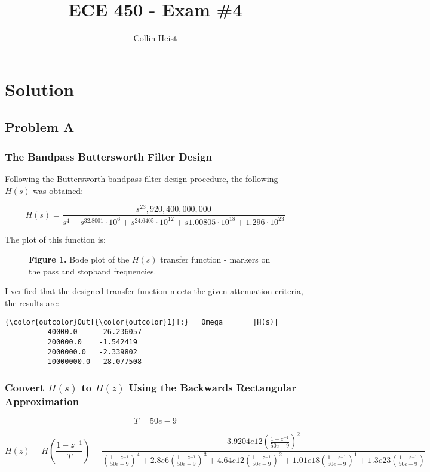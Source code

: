 \documentclass[11pt]{article}
\author{Collin Heist}
\title{ECE 450 - Exam \#4}
\begin{document}
    
    
    \maketitle
    
    

    
\section{Solution}
\subsection{Problem A}
\subsubsection{The Bandpass Buttersworth Filter Design}
Following the Buttersworth bandpass filter design procedure, the following $H(s)$ was obtained:

$$H(s)=\frac{s^23,920,400,000,000}{s^4+s^32.8001\cdot 10^6+s^24.6405\cdot 10^{12}+s1.00805\cdot 10^{18}+1.296\cdot 10^{23}}$$

The plot of this function is:

\begin{figure}[H]
\begin{center}
\caption{\textbf{Figure 1.} Bode plot of the $H(s)$ transfer function - markers on the pass and stopband frequencies.}
\end{center}
\end{figure}

I verified that the designed transfer function meets the given attenuation criteria, the results are:

\begin{Verbatim}[commandchars=\\\{\}]
{\color{outcolor}Out[{\color{outcolor}1}]:}   Omega       |H(s)|
          40000.0     -26.236057
          200000.0    -1.542419
          2000000.0   -2.339802
          10000000.0  -28.077508
\end{Verbatim}

\subsubsection{Convert $H(s)$ to $H(z)$ Using the Backwards Rectangular Approximation}
$$T = 50e-9$$

\[H(z)=H(\frac{1-z^{-1}}{T})=\frac{3.9204e12(\frac{1-z^{-1}}{50e-9})^2}{(\frac{1-z^{-1}}{50e-9})^4+2.8e6(\frac{1-z^{-1}}{50e-9})^3+4.64e12(\frac{1-z^{-1}}{50e-9})^2+1.01e18(\frac{1-z^{-1}}{50e-9})^1+1.3e23(\frac{1-z^{-1}}{50e-9})}\]
\end{document}
